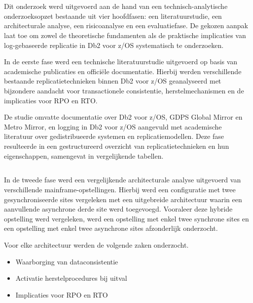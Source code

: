 \chapter{}%
\label{ch:methodologie}

Dit onderzoek werd uitgevoerd aan de hand van een technisch-analytische onderzoeksopzet bestaande uit vier hoofdfasen: een literatuurstudie, een architecturale analyse, een risicoanalyse en een evaluatiefase. 
De gekozen aanpak laat toe om zowel de theoretische fundamenten als de praktische implicaties van log-gebaseerde replicatie in Db2 voor z/OS systematisch te onderzoeken.

In de eerste fase werd een technische literatuurstudie uitgevoerd op basis van academische publicaties en officiële documentatie. 
Hierbij werden verschillende bestaande replicatietechnieken binnen Db2 voor z/OS geanalyseerd met bijzondere aandacht voor transactionele consistentie, herstelmechanismen en de implicaties voor RPO en RTO\@.

De studie omvatte documentatie over Db2 voor z/OS, GDPS Global Mirror en Metro Mirror, en logging in Db2 voor z/OS aangevuld met academische literatuur over gedistribueerde systemen en replicatiemodellen. 
Deze fase resulteerde in een gestructureerd overzicht van replicatietechnieken en hun eigenschappen, samengevat in vergelijkende tabellen.

\section{}%
\label{sec:methodologie-architecturale-analyse}

In de tweede fase werd een vergelijkende architecturale analyse uitgevoerd van verschillende mainframe-opstellingen. 
Hierbij werd een configuratie met twee gesynchroniseerde sites vergeleken met een uitgebreide architectuur waarin een aanvullende asynchrone derde site werd toegevoegd.
Vooraleer deze hybride opstelling werd vergeleken, werd een opstelling met enkel twee synchrone sites en een opstelling met enkel twee asynchrone sites afzonderlijk onderzocht.

Voor elke architectuur werden de volgende zaken onderzocht.
\begin{itemize}
    \item Waarborging van dataconsistentie
    \item Activatie herstelprocedures bij uitval
    \item Implicaties voor RPO en RTO\@
\end{itemize}


